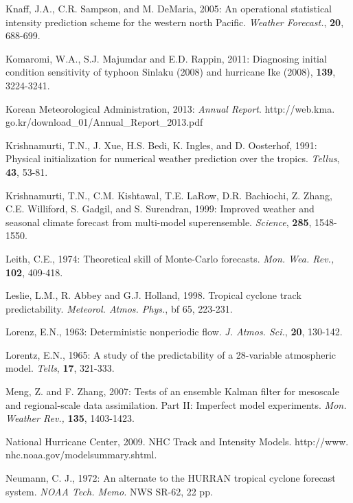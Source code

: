 \documentclass[a4paper, 12pt]{article}
\begin{document}
{\begin{list}{}{\leftmargin=1em \itemindent=-2em}
\item Knaff, J.A., C.R. Sampson, and M. DeMaria, 2005: An operational statistical intensity prediction scheme for the western north Pacific. \emph{Weather Forecast.}, {\bf 20}, 688-699.


    \item Komaromi, W.A., S.J. Majumdar and E.D. Rappin, 2011: Diagnosing initial condition sensitivity of typhoon Sinlaku (2008) and hurricane Ike (2008), {\bf 139}, 3224-3241.

\item  Korean Meteorological Administration, 2013: {\em Annual Report}.  http://web.kma. go.kr/download\_01/Annual\_Report\_2013.pdf

\item Krishnamurti, T.N., J. Xue, H.S. Bedi, K. Ingles, and D. Oosterhof, 1991: Physical initialization for numerical weather prediction over the tropics. \emph{Tellus}, {\bf 43}, 53-81.

\item Krishnamurti, T.N., C.M. Kishtawal, T.E. LaRow, D.R. Bachiochi, Z. Zhang, C.E. Williford, S. Gadgil, and S. Surendran, 1999: Improved weather and seasonal climate forecast from multi-model superensemble. \emph{Science}, {\bf 285}, 1548-1550.

\item Leith, C.E., 1974: Theoretical skill of Monte-Carlo forecasts. \emph{Mon. Wea. Rev.,} {\bf 102}, 409-418.

\item Leslie, L.M., R. Abbey and G.J. Holland, 1998. Tropical cyclone track predictability. \emph{Meteorol. Atmos. Phys.}, {bf 65}, 223-231.

\item Lorenz, E.N., 1963: Deterministic nonperiodic flow. \emph{J. Atmos. Sci.}, {\bf 20}, 130-142.
\item Lorentz, E.N., 1965: A study of the predictability of a 28-variable atmospheric model. \emph{Tells}, {\bf 17}, 321-333.

\item Meng, Z. and F. Zhang, 2007: Tests of an ensemble Kalman filter for mesoscale and regional-scale data assimilation. Part II: Imperfect model experiments. \emph{Mon. Weather Rev.,} {\bf 135}, 1403-1423.

    \item National Hurricane Center, 2009. NHC Track and Intensity Models. http://www. nhc.noaa.gov/modelsummary.shtml.

\item Neumann, C. J., 1972: An alternate to the HURRAN tropical cyclone forecast system. \emph{NOAA Tech. Memo.} NWS SR-62, 22 pp.


\end{list}}
\end{document}
